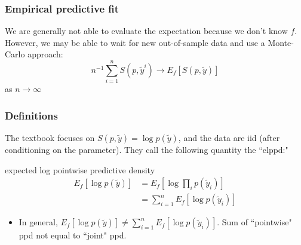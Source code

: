 \documentclass{beamer}
\begin{document}
\begin{frame}
\frametitle{Empirical predictive fit}


We are generally not able to evaluate the expectation because we don't know $f$. However, we may be able to wait for new out-of-sample data and use a Monte-Carlo approach:
\[
n^{-1}\sum_{i=1}^{n} S(p,\tilde{y}^i) \to E_f[S(p,\tilde{y})]
\]
as $n \to \infty$
\newline
\pause


\end{frame}



\begin{frame}
\frametitle{Definitions}

The textbook focuses on $S(p,\tilde{y}) = \log p(\tilde{y})$, and the data are iid (after conditioning on the parameter). They call the following quantity the ``elppd:"

\begin{block}{expected log pointwise predictive density}
\begin{align*}
E_f [\log p(\tilde{y})] &= E_f\left[\log \prod_i p(\tilde{y}_i) \right] \\
&= \sum_{i=1}^nE_f\left[ \log p(\tilde{y}_i) \right]
\end{align*}
\end{block}

\begin{itemize}
\item In general, $E_f [\log p(\tilde{y})] \neq \sum_{i=1}^nE_f\left[
    \log p(\tilde{y}_i) \right]$. Sum of ``pointwise" ppd not equal to
    ``joint" ppd.
\end{itemize}

\end{frame}
\end{document}
